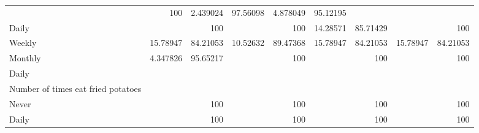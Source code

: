 \documentclass{article}
\begin{document}
\begin{tabular}{lllllllll}
  \multicolumn{1}{r}{} &
  \multicolumn{1}{r}{100} &
  \multicolumn{1}{r}{2.439024} &
  \multicolumn{1}{r}{97.56098} &
  \multicolumn{1}{r}{4.878049} &
  \multicolumn{1}{r}{95.12195} \\
\multicolumn{1}{l}{\hspace{7em}Daily} &
  \multicolumn{1}{|r}{} &
  \multicolumn{1}{r}{100} &
  \multicolumn{1}{r}{} &
  \multicolumn{1}{r}{100} &
  \multicolumn{1}{r}{14.28571} &
  \multicolumn{1}{r}{85.71429} &
  \multicolumn{1}{r}{} &
  \multicolumn{1}{r}{100} \\
\multicolumn{1}{l}{\hspace{7em}Weekly} &
  \multicolumn{1}{|r}{15.78947} &
  \multicolumn{1}{r}{84.21053} &
  \multicolumn{1}{r}{10.52632} &
  \multicolumn{1}{r}{89.47368} &
  \multicolumn{1}{r}{15.78947} &
  \multicolumn{1}{r}{84.21053} &
  \multicolumn{1}{r}{15.78947} &
  \multicolumn{1}{r}{84.21053} \\
\multicolumn{1}{l}{\hspace{7em}Monthly} &
  \multicolumn{1}{|r}{4.347826} &
  \multicolumn{1}{r}{95.65217} &
  \multicolumn{1}{r}{} &
  \multicolumn{1}{r}{100} &
  \multicolumn{1}{r}{} &
  \multicolumn{1}{r}{100} &
  \multicolumn{1}{r}{} &
  \multicolumn{1}{r}{100} \\
\multicolumn{1}{l}{\hspace{5em}Daily} &
  \multicolumn{1}{|r}{} &
  \multicolumn{1}{r}{} &
  \multicolumn{1}{r}{} &
  \multicolumn{1}{r}{} &
  \multicolumn{1}{r}{} &
  \multicolumn{1}{r}{} &
  \multicolumn{1}{r}{} &
  \multicolumn{1}{r}{} \\
\multicolumn{1}{l}{\hspace{6em}Number of times eat fried potatoes} &
  \multicolumn{1}{|r}{} &
  \multicolumn{1}{r}{} &
  \multicolumn{1}{r}{} &
  \multicolumn{1}{r}{} &
  \multicolumn{1}{r}{} &
  \multicolumn{1}{r}{} &
  \multicolumn{1}{r}{} &
  \multicolumn{1}{r}{} \\
\multicolumn{1}{l}{\hspace{7em}Never} &
  \multicolumn{1}{|r}{} &
  \multicolumn{1}{r}{100} &
  \multicolumn{1}{r}{} &
  \multicolumn{1}{r}{100} &
  \multicolumn{1}{r}{} &
  \multicolumn{1}{r}{100} &
  \multicolumn{1}{r}{} &
  \multicolumn{1}{r}{100} \\
\multicolumn{1}{l}{\hspace{7em}Daily} &
  \multicolumn{1}{|r}{} &
  \multicolumn{1}{r}{100} &
  \multicolumn{1}{r}{} &
  \multicolumn{1}{r}{100} &
  \multicolumn{1}{r}{} &
  \multicolumn{1}{r}{100} &
  \multicolumn{1}{r}{} &
  \multicolumn{1}{r}{100} \\

\end{tabular}
\end{document}
